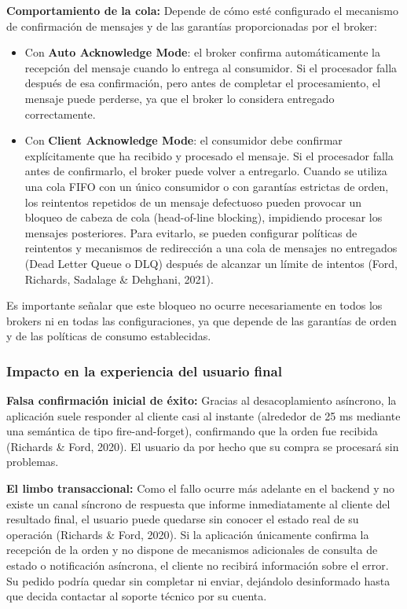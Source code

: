 \documentclass[12pt, a4paper]{article}
\begin{document}
    \textbf{Comportamiento de la cola:} Depende de cómo esté configurado el mecanismo de confirmación de mensajes y de las garantías proporcionadas por el broker:

    \begin{itemize}
    \item Con \textbf{Auto Acknowledge Mode}: el broker confirma automáticamente la recepción del mensaje cuando lo entrega al consumidor. Si el procesador falla después de esa confirmación, pero antes de completar el procesamiento, el mensaje puede perderse, ya que el broker lo considera entregado correctamente.
    \item Con \textbf{Client Acknowledge Mode}: el consumidor debe confirmar explícitamente que ha recibido y procesado el mensaje. Si el procesador falla antes de confirmarlo, el broker puede volver a entregarlo. Cuando se utiliza una cola FIFO con un único consumidor o con garantías estrictas de orden, los reintentos repetidos de un mensaje defectuoso pueden provocar un bloqueo de cabeza de cola (head-of-line blocking), impidiendo procesar los mensajes posteriores. Para evitarlo, se pueden configurar políticas de reintentos y mecanismos de redirección a una cola de mensajes no entregados (Dead Letter Queue o DLQ) después de alcanzar un límite de intentos (Ford, Richards, Sadalage \& Dehghani, 2021).
    \end{itemize}

    Es importante señalar que este bloqueo no ocurre necesariamente en todos los brokers ni en todas las configuraciones, ya que depende de las garantías de orden y de las políticas de consumo establecidas.

    \subsubsection{Impacto en la experiencia del usuario final}
    \textbf{Falsa confirmación inicial de éxito:} Gracias al desacoplamiento asíncrono, la aplicación suele responder al cliente casi al instante (alrededor de 25 ms mediante una semántica de tipo fire-and-forget), confirmando que la orden fue recibida (Richards \& Ford, 2020). El usuario da por hecho que su compra se procesará sin problemas.

    \textbf{El limbo transaccional:} Como el fallo ocurre más adelante en el backend y no existe un canal síncrono de respuesta que informe inmediatamente al cliente del resultado final, el usuario puede quedarse sin conocer el estado real de su operación (Richards \& Ford, 2020). Si la aplicación únicamente confirma la recepción de la orden y no dispone de mecanismos adicionales de consulta de estado o notificación asíncrona, el cliente no recibirá información sobre el error. Su pedido podría quedar sin completar ni enviar, dejándolo desinformado hasta que decida contactar al soporte técnico por su cuenta.
\end{document}
